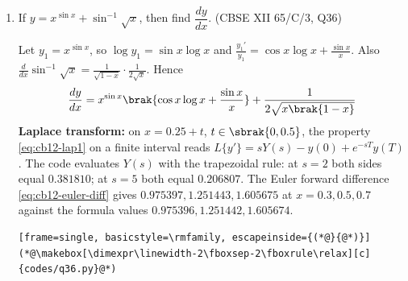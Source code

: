 \begin{enumerate}[label=\thesubsection.\arabic*, ref=\thesubsection.\theenumi,itemsep=0pt]
\solution With $h = \frac{2}{n}$ and $f(x) = x^2 + 1 + e^x$,
\begin{align}
\int_1^3 f\,dx &= \lim_{n\to\infty}h\sum_{i=1}^{n}f\brak{1+ih} \\
&= \lim_{n\to\infty}h\sbrak{2n + 2h\frac{n\brak{n+1}}{2} + h^2\frac{n\brak{n+1}\brak{2n+1}}{6} + e\frac{e^h\brak{e^{nh}-1}}{e^h - 1}}
\end{align}
Using $nh = 2$ and $\frac{h}{e^h-1} \to 1$, the limit is $4 + 4 + \frac{8}{3} + e\brak{e^2 - 1}$, so
\begin{align}
\int_1^3 f\,dx &= \frac{32}{3} + e^3 - e \approx 28.03392
\end{align}
The trapezoidal rule \eqref{eq:cb12-trap} gives $28.4776$ for $N = 4$, $28.0357$ for $N = 64$ and $28.03392$ for $N = 16384$, converging to the same value. The following code verifies this.
\begin{lstlisting}[frame=single, basicstyle=\rmfamily, escapeinside={(*@}{@*)}]
(*@\makebox[\dimexpr\linewidth-2\fboxsep-2\fboxrule\relax][c]{codes/q34.py}@*)
\end{lstlisting}

\item If $y = x^{\sin x} + \sin^{-1}\sqrt{x}$, then find $\dfrac{dy}{dx}$.
\hfill (CBSE XII 65/C/3, Q36)

\solution Let $y_1 = x^{\sin x}$, so $\log y_1 = \sin x\log x$ and $\frac{y_1'}{y_1} = \cos x\log x + \frac{\sin x}{x}$. Also $\frac{d}{dx}\sin^{-1}\sqrt{x} = \frac{1}{\sqrt{1-x}}\cdot\frac{1}{2\sqrt{x}}$. Hence
\begin{align}
\frac{dy}{dx} = x^{\sin x}\brak{\cos x\log x + \frac{\sin x}{x}} + \frac{1}{2\sqrt{x\brak{1-x}}}
\end{align}
\textbf{Laplace transform:} on $x = 0.25 + t$, $t \in \sbrak{0, 0.5}$, the property \eqref{eq:cb12-lap1} on a finite interval reads $L\{y'\} = sY(s) - y(0) + e^{-sT}y(T)$. The code evaluates $Y(s)$ with the trapezoidal rule: at $s = 2$ both sides equal $0.381810$; at $s = 5$ both equal $0.206807$. The Euler forward difference \eqref{eq:cb12-euler-diff} gives $0.975397, 1.251443, 1.605675$ at $x = 0.3, 0.5, 0.7$ against the formula values $0.975396, 1.251442, 1.605674$.
\begin{lstlisting}[frame=single, basicstyle=\rmfamily, escapeinside={(*@}{@*)}]
(*@\makebox[\dimexpr\linewidth-2\fboxsep-2\fboxrule\relax][c]{codes/q36.py}@*)
\end{lstlisting}

\end{enumerate}
